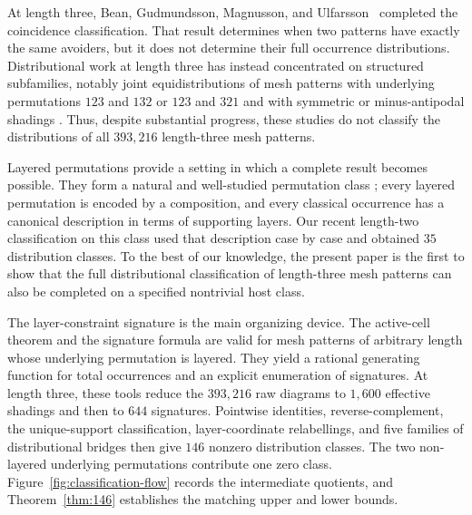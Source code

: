 \documentclass[12pt]{article}
\begin{document}
At length three, Bean, Gudmundsson, Magnusson, and
Ulfarsson~\cite{BeanEtAl2023} completed the coincidence classification.  That
result determines when two patterns have exactly the same avoiders, but it
does not determine their full occurrence distributions.  Distributional work
at length three has instead concentrated on structured subfamilies, notably
joint equidistributions of mesh patterns with underlying permutations $123$
and $132$ or $123$ and $321$ and with symmetric or minus-antipodal shadings
\cite{LvKitaev2025,LvZhang123132,LvZhang123321}.  Thus, despite substantial
progress, these studies do not classify the distributions of all
$393{,}216$ length-three mesh patterns.

Layered permutations provide a setting in which a complete result becomes
possible.  They form a natural and well-studied permutation class
\cite{AEPV}; every layered permutation is encoded by a composition, and every
classical occurrence has a canonical description in terms of supporting
layers.  Our recent length-two classification on this class
\cite{ZKPSlengthtwo} used that description case by case and obtained $35$
distribution classes.  To the best of our knowledge, the present paper is the
first to show that the full distributional classification of length-three mesh
patterns can also be completed on a specified nontrivial host class.

The layer-constraint signature is the main organizing device.  The active-cell
theorem and the signature formula are valid for mesh patterns of arbitrary
length whose underlying permutation is layered.  They yield a rational
generating function for total occurrences and an explicit enumeration of
signatures.  At length three, these tools reduce the $393{,}216$ raw diagrams
to $1{,}600$ effective shadings and then to $644$ signatures.  Pointwise
identities, reverse-complement, the unique-support classification,
layer-coordinate relabellings, and five families of distributional bridges
then give $146$ nonzero distribution classes.  The two non-layered underlying
permutations contribute one zero class.  Figure~\ref{fig:classification-flow}
records the intermediate quotients, and
Theorem~\ref{thm:146} establishes the matching upper and lower bounds.
\end{document}
